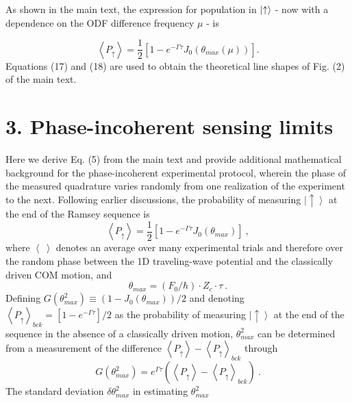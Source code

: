 \documentclass[aps,prl,onecolumn,superscriptaddress,floatfix]{revtex4-1}
\begin{document}
As shown in the main text, the expression for population in $\ket{\uparrow}$ - now with a dependence on the ODF difference frequency $\mu$ - is

\begin{equation}
\left< P_{\uparrow} \right> = \frac{1}{2} \left[ 1-e^{-\Gamma \tau}J_0(\theta_{max}(\mu)) \right].
\label{Bessel}
\end{equation}
Equations (17) and (18) are used to obtain the theoretical line shapes of Fig. (2) of the main text.
\section{3. Phase-incoherent sensing limits}

Here we derive Eq. (5) from the main text and provide additional mathematical background for the phase-incoherent experimental protocol, wherein the phase of the measured quadrature varies randomly from one realization of the experiment to the next. Following earlier discussions, the probability of measuring $\left|\uparrow\right\rangle $
at the end of the Ramsey sequence is 
\begin{equation}
\left\langle P_{\uparrow}\right\rangle =\frac{1}{2}\left[1-e^{-\Gamma\tau}J_{0}\left(\theta_{max}\right)\right]\:,\label{eq:P_up formula}
\end{equation}
where $\left\langle \:\right\rangle $ denotes an average over many
experimental trials and therefore over the random phase between the
1D traveling-wave potential and the classically driven COM motion, and
\begin{equation}
\theta_{max}=(F_{0}/\hbar) \cdot Z_{c}\cdot\tau\:.\label{eq:theta_max formula}
\end{equation}
Defining $G\left(\theta_{max}^{2}\right)\equiv\left(1-J_{0}\left(\theta_{max}\right)\right)/2$
and denoting $\left\langle P_{\uparrow}\right\rangle _{bck}=\left[1-e^{-\Gamma\tau}\right]/2$
as the probability of measuring $\left|\uparrow\right\rangle $ at
the end of the sequence in the absence of a classically driven motion,
$\theta_{max}^{2}$ can be determined from a measurement of the difference
$\left\langle P_{\uparrow}\right\rangle -\left\langle P_{\uparrow}\right\rangle _{bck}$
through
\begin{equation}
G\left(\theta_{max}^{2}\right)=e^{\Gamma\tau}\left(\left\langle P_{\uparrow}\right\rangle -\left\langle P_{\uparrow}\right\rangle _{bck}\right)\:.\label{eq:P_up difference}
\end{equation}
The standard deviation $\delta\theta_{max}^{2}$ in estimating $\theta_{max}^{2}$
\end{document}
